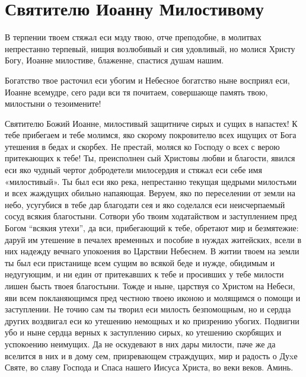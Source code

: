 \mychapterending


 

\section{Святителю Иоанну Милостивому}\begin{mymulticols}
 


В терпении твоем стяжал еси мзду твою, отче преподобне, в молитвах непрестанно терпевый, нищия возлюбивый и сия удовливый, но молися Христу Богу, Иоанне милостиве, блаженне, спастися душам нашим.


Богатство твое расточил еси убогим и Небесное богатство ныне восприял еси, Иоанне всемудре, сего ради вси тя почитаем, совершающе память твою, милостыни о тезоимените!


Святителю Божий Иоанне, милостивый защитниче сирых и сущих в напастех! К тебе прибегаем и тебе молимся, яко скорому покровителю всех ищущих от Бога утешения в бедах и скорбех. Hе престай, моляся ко Господу о всех с верою притекающих к тебе! Ты, преисполнен сый Христовы любви и благости, явился еси яко чудный чертог добродетели милосердия и стяжал еси себе имя «милостивый». Ты был еси яко река, непрестанно текущая щедрыми милостьми и всех жаждущих обильно напаяющая. Веруем, яко по переселении от земли на небо, усугубися в тебе дар благодати сея и яко соделался еси неисчерпаемый сосуд всякия благостыни. Сотвори убо твоим ходатайством и заступлением пред Богом “всякия утехи”, да вси, прибегающий к тебе, обретают мир и безмятежие: даруй им утешение в печалех временных и пособие в нуждах житейских, всели в них надежду вечнаго упокоения во Царствии Небеснем. В житии твоем на земли ты был еси пристанище всем сущим во всякой беде и нужде, обидимым и недугующим, и ни един от притекавших к тебе и просивших у тебе милости лишен бысть твоея благостыни. Тожде и ныне, царствуя со Христом на Небеси, яви всем покланяющимся пред честною твоею иконою и молящимся о помощи и заступлении. Не точию сам ты творил еси милость безпомощным, но и сердца других воздвигал еси ко утешению немощных и ко призрению убогих. Подвигни убо и ныне сердца верных к заступлению сирых, ко утешению скорбящих и успокоению неимущих. Да не оскудевают в них дары милости, паче же да вселится в них и в дому сем, призревающем страждущих, мир и радость о Дуxе Святе, во славу Господа и Спаса нашего Иисуса Христа, во веки веков. Аминь.

\end{mymulticols}

